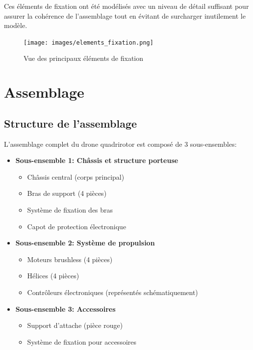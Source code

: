 \documentclass[a4paper,12pt]{report}
\begin{document}
Ces éléments de fixation ont été modélisés avec un niveau de détail suffisant pour assurer la cohérence de l'assemblage tout en évitant de surcharger inutilement le modèle.

\begin{figure}[H]
    \centering
    \texttt{[image: images/elements\_fixation.png]}
    \caption{Vue des principaux éléments de fixation}
    \label{fig:fixations}
\end{figure}

\chapter{Assemblage}
\section{Structure de l'assemblage}
L'assemblage complet du drone quadrirotor est composé de 3 sous-ensembles:
\begin{itemize}
    \item \textbf{Sous-ensemble 1: Châssis et structure porteuse}
    \begin{itemize}
        \item Châssis central (corps principal)
        \item Bras de support (4 pièces)
        \item Système de fixation des bras
        \item Capot de protection électronique
    \end{itemize}
    
    \item \textbf{Sous-ensemble 2: Système de propulsion}
    \begin{itemize}
        \item Moteurs brushless (4 pièces)
        \item Hélices (4 pièces)
        \item Contrôleurs électroniques (représentés schématiquement)
    \end{itemize}
    
    \item \textbf{Sous-ensemble 3: Accessoires}
    \begin{itemize}
        \item Support d'attache (pièce rouge)
        \item Système de fixation pour accessoires
    \end{itemize}
\end{itemize}
\end{document}
